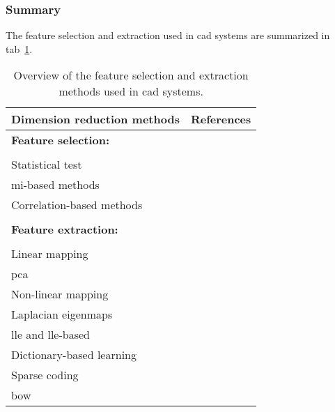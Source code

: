 
\subsubsection{Summary}

The feature selection and extraction used in \ac{cad} systems are summarized in \acs{tab}~\ref{tab:featext}.

\begin{table}
  \caption{Overview of the feature selection and extraction methods used in \acs*{cad} systems.}
  \scriptsize
  \centering
  \begin{tabular}{l r}
    \toprule
    \textbf{Dimension reduction methods} & \textbf{References} \\
    \midrule
    \textbf{Feature selection:} & \\ \\ [-1.5ex]
    \quad Statistical test & \cite{Niaf2011,Niaf2012,Vos2012} \\
    \quad \ac{mi}-based methods & \cite{Niaf2011,Niaf2012,Vos2008,lehaire2014computer,khalvati2015automated,chung2015prostate} \\
    \quad Correlation-based methods & \cite{rampun2016computer,rampun2015computer} \\ \\ [-1.5ex]
    \textbf{Feature extraction:} & \\ \\ [-1.5ex]
    \quad Linear mapping & \\
    \quad \quad \acs*{pca} & \cite{Tiwari2008,Tiwari2009} \\
    \quad Non-linear mapping & \\
    \quad \quad Laplacian eigenmaps & \cite{Tiwari2007,Tiwari2009a,Tiwari2009,Tiwari2010,Viswanath2008,Viswanath2011} \\
    \quad \quad \acs*{lle} and \acs*{lle}-based & \cite{Tiwari2008,Tiwari2009,Viswanath2008a,Viswanath2008} \\
    \quad Dictionary-based learning & \\
    \quad \quad Sparse coding & \cite{lehaire2014computer} \\
    \quad \quad \acs*{bow} & \cite{rampun2016computerb,rampun2015classifying} \\
    \bottomrule
  \end{tabular}
\label{tab:featext}
\end{table} 
